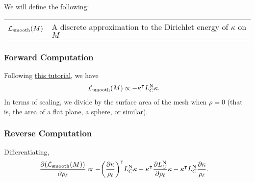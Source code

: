 

We will define the following: \begin{center}\begin{tabular}{r|l}
	\(\mathcal{L}_{\mathrm{smooth}}\pof{M}\) & A discrete approximation to the Dirichlet energy of \(\kappa\) on \(M\)
\end{tabular}\end{center}

\subsubsection{Forward Computation}
Following \href{https://www.cs.cmu.edu/~kmcrane/Projects/Other/SwissArmyLaplacian.pdf#page=28}{this tutorial}, we have \begin{align*}
	\mathcal{L}_{\mathrm{smooth}}\pof{M} &\propto -\kappa^\intercal L_C^{\text{N}}\kappa.
\end{align*} In terms of scaling, we divide by the surface area of the mesh when \(\rho = 0\) (that is, the area of a flat plane, a sphere, or similar).

\subsubsection{Reverse Computation}
Differentiating, \begin{align*}
	\frac{\partial\pof{\mathcal{L}_{\mathrm{smooth}}\pof{M}}}{\partial\rho_\ell} &\propto -\pof{\frac{\partial\kappa}{\rho_\ell}}^\intercal L_C^{\text{N}}\kappa - \kappa^\intercal\frac{\partial L_C^{\text{N}}}{\partial \rho_\ell}\kappa - \kappa^\intercal L_C^{\text{N}}\frac{\partial\kappa}{\rho_\ell}.
\end{align*}
